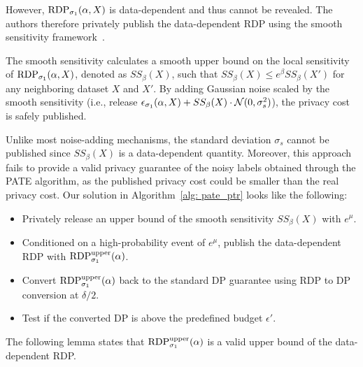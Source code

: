 However, $\mathrm{RDP}_{\sigma_1}(\alpha, X)$ is data-dependent and thus cannot be revealed. The authors therefore privately publish the data-dependent RDP using the smooth sensitivity framework~\citep{nissim2007smooth}.
\begin{comment}
\begin{definition}[Smooth Sensitivity]\label{def: smooth}
	Given the smoothness parameter $\beta$, a $\beta$-smooth sensitivity of $f(X)$ is defined as 
	\[SS_\beta(X):= \max_{d\geq 0} e^{-\beta d} \cdot \max_{\tilde{X'}: dist(X, \tilde{X'})\leq d} \Delta_{LS}(\tilde{X}')\]
\end{definition}
\end{comment}
The smooth sensitivity calculates a smooth upper bound on the local sensitivity of $\mathrm{RDP}_{\sigma_1}(\alpha, X)$, denoted as $SS_\beta(X)$, such that $SS_\beta (X) \leq e^\beta SS_\beta(X')$ for any neighboring dataset $X$ and $X'$. By adding Gaussian noise scaled by the smooth sensitivity (i.e., release $\epsilon_{\sigma_1}(\alpha, X)+ SS_\beta(X)\cdot \mathcal{N}(0, \sigma_s^2)$), the privacy cost is safely published. 


Unlike most noise-adding mechanisms, the standard deviation $\sigma_s$ cannot be published since $SS_\beta(X)$ is a data-dependent quantity. Moreover, this approach fails to provide a valid privacy guarantee of the noisy labels obtained through the PATE algorithm, as the published privacy cost could be smaller than the real privacy cost.
Our solution in Algorithm~\ref{alg: pate_ptr} looks like the following:
\begin{itemize}
    \item Privately release an upper bound of the smooth sensitivity $SS_\beta(X)$ with $e^{\mu}$. %
    \item Conditioned on a high-probability event of $e^{\mu}$, publish the data-dependent RDP with $\mathrm{RDP}_{\sigma_1}^{\text{upper}}(\alpha)$.
    \item Convert $\mathrm{RDP}_{\sigma_1}^{\text{upper}}(\alpha)$ back to the standard DP guarantee using RDP to DP conversion at $\delta/2$.  %
    \item Test if the converted DP is above the predefined budget $\epsilon'$.
\end{itemize}
The following lemma states that $\mathrm{RDP}_{\sigma_1}^{\text{upper}}(\alpha)$ is a valid upper bound of the data-dependent RDP.

